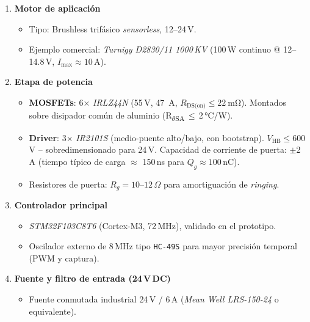 \begin{enumerate}[label=\textbf{\arabic*.}]
\item \textbf{Motor de aplicación}
  \begin{itemize}
    \item Tipo: Brushless trifásico \textit{sensorless}, 12--24\,V.
    \item Ejemplo comercial: \emph{Turnigy D2830/11 1000\,KV} (100\,W continuo @ 12--14.8\,V, $I_\text{max} \approx 10$\,A).
  \end{itemize}

\item \textbf{Etapa de potencia}
  \begin{itemize}
    \item \textbf{MOSFETs}: 6$\times$ \emph{IRLZ44N} (55\,V, \SI{47}{A}, $R_\text{DS(on)} \leq \SI{22}{\milli\ohm}$).  
    Montados sobre disipador común de aluminio (R\textsubscript{$\theta$SA}\,$\leq$\,2\,°C/W).  
    \item \textbf{Driver}: 3$\times$ \emph{IR2101S} (medio-puente alto/bajo, con bootstrap).  
    $V_\text{HB} \leq 600$\,V – sobredimensionado para 24\,V.  
    Capacidad de corriente de puerta: $\pm$2\,A (tiempo típico de carga $\approx$ 150\,ns para $Q_g \approx 100$\,nC).
    \item Resistores de puerta: $R_g = 10$--$12\,\Omega$ para amortiguación de \emph{ringing}.
  \end{itemize}

\item \textbf{Controlador principal}
  \begin{itemize}
    \item \emph{STM32F103C8T6} (Cortex-M3, 72\,MHz), validado en el prototipo.
    \item Oscilador externo de 8\,MHz tipo \texttt{HC-49S} para mayor precisión temporal (PWM y captura).
  \end{itemize}

\item \textbf{Fuente y filtro de entrada (24\,V\,DC)}
  \begin{itemize}
    \item Fuente conmutada industrial 24\,V / 6\,A (\emph{Mean Well LRS-150-24} o equivalente).
  \end{itemize}


\end{enumerate}
